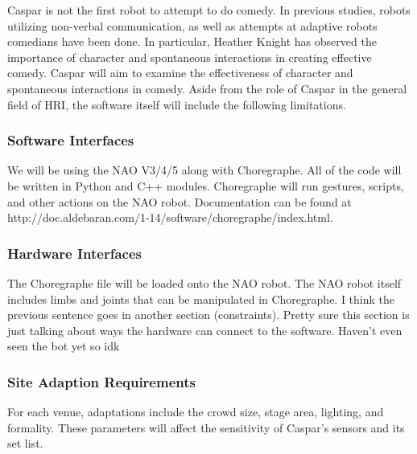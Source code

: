 \documentclass[onecolumn, draftclsnofoot,10pt, compsoc]{IEEEtran}
\begin{document}

Caspar is not the first robot to attempt to do comedy. In previous studies, robots utilizing non-verbal communication, as well as attempts at adaptive robots comedians have been done. In particular, Heather Knight has observed the importance of character and spontaneous interactions in creating effective comedy. Caspar will aim to examine the effectiveness of character and spontaneous interactions in comedy. Aside from the role of Caspar in the general field of HRI, the software itself will include the following limitations.

\subsubsection{Software Interfaces}
We will be using the NAO V3/4/5 along with Choregraphe. All of the code will be written in Python and C++ modules. Choregraphe will run gestures, scripts, and other actions on the NAO robot. Documentation can be found at http://doc.aldebaran.com/1-14/software/choregraphe/index.html.
\subsubsection{Hardware Interfaces}
The Choregraphe file will be loaded onto the NAO robot. The NAO robot itself includes limbs and joints that can be manipulated in Choregraphe. I think the previous sentence goes in another section (constraints). Pretty sure this section is just talking about ways the hardware can connect to the software. Haven’t even seen the bot yet so idk

\subsubsection{Site Adaption Requirements}
For each venue, adaptations include the crowd size, stage area, lighting, and formality. These parameters will affect the sensitivity of Caspar's sensors and its set list.
\end{document}
